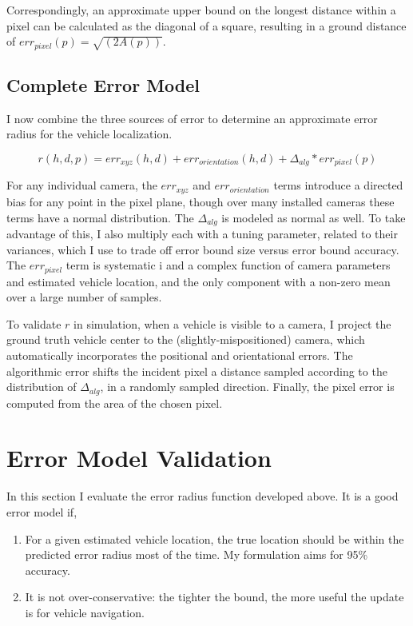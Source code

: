 \documentclass[a4paper,12pt,twoside,openright]{report}
\begin{document}
Correspondingly, an approximate upper bound on the longest distance
within a pixel can be calculated as the diagonal of a square,
resulting in a ground distance of $err_{pixel}(p) = \sqrt{(2A(p))}$. 


\subsection{Complete Error Model}

I now combine the three sources of error to determine an approximate
error radius for the vehicle localization.

\[
    r(h,d,p) = err_{xyz}(h,d) + err_{orientation}(h,d) + \Delta_{alg}*err_{pixel}(p)
\]

For any individual camera, the $err_{xyz}$ and $err_{orientation}$ terms introduce
a directed bias for any point in the pixel plane, though over many installed cameras
these terms have a normal distribution. The $\Delta_{alg}$ is 
modeled as normal as well. To take advantage of this, I also multiply each with a tuning
parameter, related to their variances, which I use to trade off error bound size versus
error bound accuracy. The $err_{pixel}$ term is systematic i
and a complex function of camera parameters and estimated vehicle location, and
the only component with a non-zero mean over a large number of samples.

To validate $r$ in simulation, when a vehicle is visible to a camera,
I project the ground truth vehicle center to the (slightly-mispositioned) camera, which
automatically incorporates the positional and orientational errors.
The algorithmic error shifts the incident pixel a distance sampled according to the distribution 
of $\Delta_{alg}$, in a randomly sampled direction. 
Finally, the pixel error is computed from the area of the chosen pixel.

\section{Error Model Validation}
\label{sec:camera:validation}

In this section I evaluate the error radius function developed above. It is a good error model if,

\begin{enumerate}
    \item For a given estimated vehicle location, the true location should be within the predicted
          error radius most of the time. My formulation aims for 95\% accuracy.
    \item It is not over-conservative: the tighter the bound, the more useful the update is
          for vehicle navigation.
\end{enumerate}
\end{document}

